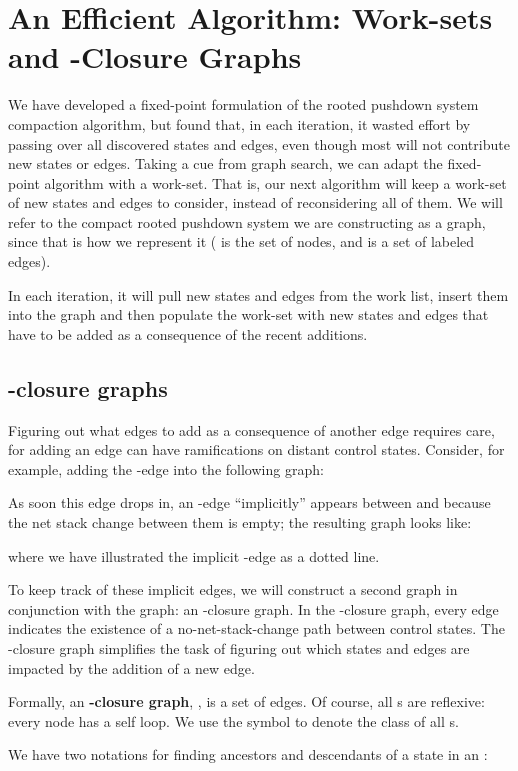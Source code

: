 \section{An Efficient Algorithm: Work-sets and 
    -Closure Graphs}
\label{sec:ecg-worklist}
We have developed a fixed-point formulation of the rooted pushdown
system compaction algorithm, but found that, in each iteration, it
wasted effort by passing over all discovered states and edges, even
though most will not contribute new states or edges.
Taking a cue from graph search, we can adapt the fixed-point algorithm
with a work-set.
That is, our next algorithm will keep a work-set of new states and
edges to consider, instead of reconsidering all of them.
We will refer to the compact rooted pushdown system we are constructing as a graph, since that is how we represent it ( is the set of nodes, and  is a set of labeled edges).

In each iteration, it will pull new states and edges from the work
list, insert them into the graph and then populate the
work-set with new states and edges that have to be added as a
consequence of the recent additions.

\subsection{-closure graphs}
Figuring out what edges to add as a consequence of another edge
requires care, for adding an edge can have ramifications on distant
control states.
Consider, for example, adding the -edge  into the following graph:

As soon this edge drops in, an -edge ``implicitly'' appears
 between  and  because the net
stack change between them is empty; the resulting graph looks like:

where we have illustrated the implicit -edge as a dotted line.

To keep track of these implicit edges, we will construct a second
graph in conjunction with the graph: an -closure
graph.
In the -closure graph, every edge indicates the existence of
a no-net-stack-change path between control states.
The -closure graph simplifies the task of figuring out
which states and edges are impacted by the addition of a new edge.

Formally, an \textbf{-closure graph}, , is
a set of edges.
Of course, all \ecg s are reflexive: every node has a self loop.
We use the symbol  to denote the class of all \ecg s.


We have two notations for finding ancestors and descendants of a state
in an \ecg{}:



